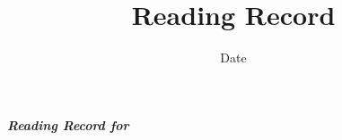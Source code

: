 


\title{Reading Record\bigskip\\
\cite{}
}
\author{}
\date{Date}


\maketitle

\textbf{\textit{Reading Record for \cite{}}}























